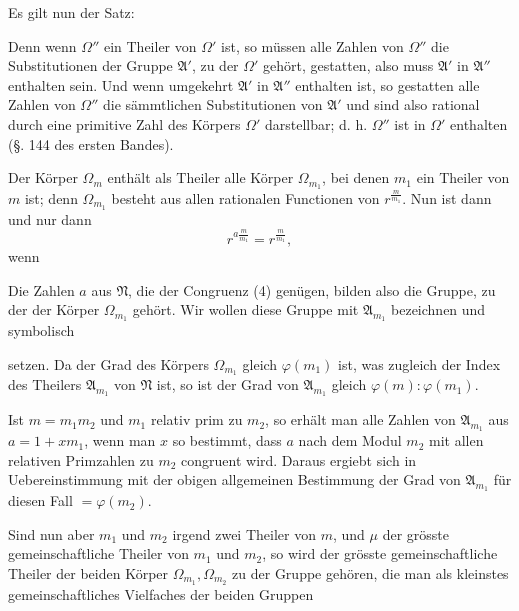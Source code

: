 Es gilt nun der Satz:


Denn wenn $\Omega''$ ein Theiler von $\Omega'$ ist, so müssen alle Zahlen
von $\Omega''$ die Substitutionen der Gruppe $\mathfrak{A}'$, zu der $\Omega'$ gehört, gestatten, also muss $\mathfrak{A}'$ in $\mathfrak{A}''$ enthalten sein. Und wenn umgekehrt $\mathfrak{A}'$ in $\mathfrak{A}''$
enthalten ist, so gestatten alle Zahlen von $\Omega''$
die sämmtlichen Substitutionen von $\mathfrak{A}'$ und sind also rational
durch eine primitive Zahl des Körpers $\Omega'$ darstellbar; d. h. $\Omega''$
ist in $\Omega'$ enthalten (§. 144 des ersten Bandes).

Der Körper $\Omega_m$ enthält als Theiler alle Körper $\Omega_{m_1}$, bei
denen $m_1$ ein Theiler von $m$ ist; denn $\Omega_{m_1}$ besteht aus allen
rationalen Functionen von $r^{\frac{m}{m_1}}$. Nun ist dann und nur dann
\[
r^{a\frac{m}{m_1}} = r^{\frac{m}{m_1}},
\]
wenn

Die Zahlen $a$ aus $\mathfrak{N}$, die der Congruenz (4) genügen, bilden
also die Gruppe, zu der der Körper $\Omega_{m_1}$ gehört. Wir wollen
diese Gruppe mit $\mathfrak{A}_{m_1}$ bezeichnen und symbolisch

setzen. Da der Grad des Körpers $\Omega_{m_1}$ gleich $\varphi(m_1)$ ist, was
zugleich der Index des Theilers $\mathfrak{A}_{m_1}$ von $\mathfrak{N}$ ist, so ist der Grad
von $\mathfrak{A}_{m_1}$ gleich $\varphi(m):\varphi(m_1)$.

Ist $m = m_1 m_2$ und $m_1$ relativ prim zu $m_2$, so erhält man
alle Zahlen von $\mathfrak{A}_{m_1}$ aus $a = 1 + x m_1$, wenn man $x$ so bestimmt,
dass $a$ nach dem Modul $m_2$ mit allen relativen Primzahlen zu
$m_2$ congruent wird. Daraus ergiebt sich in Uebereinstimmung
mit der obigen allgemeinen Bestimmung der Grad von $\mathfrak{A}_{m_1}$ für
diesen Fall $=\varphi(m_2)$.

Sind nun aber $m_1$ und $m_2$ irgend zwei Theiler von $m$, und
$\mu$ der grösste gemeinschaftliche Theiler von $m_1$ und $m_2$, so wird
der grösste gemeinschaftliche Theiler der beiden Körper $\Omega_{m_1}, \Omega_{m_2}$
zu der Gruppe gehören, die man als kleinstes gemeinschaftliches
Vielfaches der beiden Gruppen
